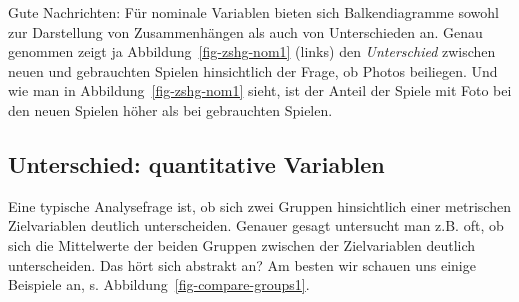 \documentclass[
  letterpaper,
]{scrbook}
\theoremstyle{definition}
\theoremstyle{definition}
\theoremstyle{definition}
\theoremstyle{remark}
\begin{document}
Gute Nachrichten: Für nominale Variablen bieten sich Balkendiagramme
sowohl zur Darstellung von Zusammenhängen als auch von Unterschieden an.
Genau genommen zeigt ja Abbildung~\ref{fig-zshg-nom1} (links) den
\emph{Unterschied} zwischen neuen und gebrauchten Spielen hinsichtlich
der Frage, ob Photos beiliegen. Und wie man in
Abbildung~\ref{fig-zshg-nom1} sieht, ist der Anteil der Spiele mit Foto
bei den neuen Spielen höher als bei gebrauchten Spielen.

\subsection{Unterschied: quantitative
Variablen}\label{unterschied-quantitative-variablen}

Eine typische Analysefrage ist, ob sich zwei Gruppen hinsichtlich einer
metrischen Zielvariablen deutlich unterscheiden. Genauer gesagt
untersucht man z.B. oft, ob sich die Mittelwerte der beiden Gruppen
zwischen der Zielvariablen deutlich unterscheiden. Das hört sich
abstrakt an? Am besten wir schauen uns einige Beispiele an, s.
Abbildung~\ref{fig-compare-groups1}.
\end{document}
